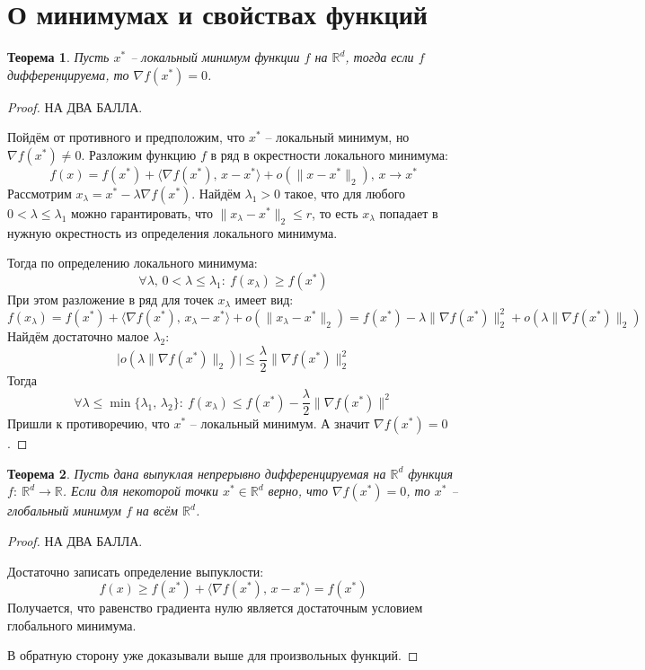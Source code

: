 \documentclass[a4paper,12pt]{article}
\renewcommand{\leq}{\ensuremath{\leqslant}}
\renewcommand{\geq}{\ensuremath{\geqslant}}
\theoremstyle{plain}
\newtheorem{theorem}{Теорема}[section]
\theoremstyle{definition}
\theoremstyle{remark}
\begin{document}
\section{О минимумах и свойствах функций}
\begin{theorem}
	Пусть $x^*$ -- локальный минимум функции $f$ на $\mathbb{R}^d$, тогда если $f$ дифференцируема, то $\nabla f(x^*) = 0$.
\end{theorem}

\begin{proof}
	НА ДВА БАЛЛА.

	Пойдём от противного и предположим, что $x^*$ -- локальный минимум, но $\nabla f(x^*) \neq 0$. Разложим функцию $f$ в ряд в окрестности локального минимума:
	\[
		f(x) = f(x^*) + \langle\nabla f(x^*),\, x- x^*\rangle + o(\|x- x^*\|_2),\, x \to x^*
	\]
	Рассмотрим $x_\lambda = x^* - \lambda\nabla f(x^*)$. Найдём $\lambda_1 > 0$ такое, что для любого $0 < \lambda \leq \lambda_1$ можно гарантировать, что $\|x_\lambda - x^*\|_2 \leq r$, то есть $x_\lambda$ попадает в нужную окрестность из определения локального минимума.

	Тогда по определению локального минимума:
	\[
		\forall \lambda,\, 0 < \lambda \leq \lambda_1 :\: f(x_\lambda) \geq f(x^*)
	\]
	При этом разложение в ряд для точек $x_\lambda$ имеет вид:
	\[
		f(x_\lambda) = f(x^*) + \langle\nabla f(x^*),\, x_\lambda - x^*\rangle + o(\|x_\lambda - x^*\|_2) = f(x^*) - \lambda\|\nabla f(x^*)\|_2^2 + o(\lambda\|\nabla f(x^*)\|_2)
	\]
	Найдём достаточно малое $\lambda_2$:
	\[
		\vert o(\lambda\|\nabla f(x^*)\|_2)\vert \leq \frac{\lambda}{2}\|\nabla f(x^*)\|_2^2
	\]
	Тогда
	\[
		\forall \lambda \leq \min\{\lambda_1,\, \lambda_2\} :\: f(x_\lambda) \leq f(x^*) - \frac{\lambda}{2} \|\nabla f(x^*)\|^2
	\]
	Пришли к противоречию, что $x^*$ -- локальный минимум. А значит $\nabla f(x^*) = 0$.
\end{proof}

\begin{theorem}
	Пусть дана выпуклая непрерывно дифференцируемая на $\mathbb{R}^d$ функция $f:\: \mathbb{R}^d \to \mathbb{R}$. Если для некоторой точки $x^* \in \mathbb{R}^d$ верно, что $\nabla f(x^*) = 0$, то $x^*$ -- глобальный минимум $f$ на всём $\mathbb{R}^d$.
\end{theorem}

\begin{proof}
	НА ДВА БАЛЛА.

	Достаточно записать определение выпуклости:
	\[
		f(x) \geq f(x^*) + \langle \nabla f(x^*),\, x - x^*\rangle = f(x^*)
	\]
	Получается, что равенство градиента нулю является достаточным условием глобального минимума.

	В обратную сторону уже доказывали выше для произвольных функций.
\end{proof}
\end{document}
